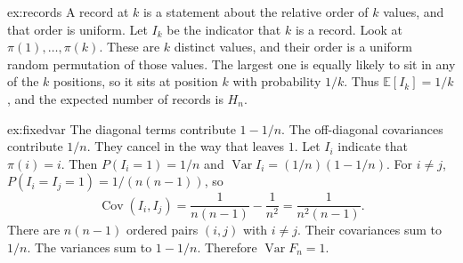 \begin{solution}{ex:records}
\idea A record at $k$ is a statement about the relative order of $k$ values, and that order is uniform.
\writeup Let $I_k$ be the indicator that $k$ is a record. Look at $\pi(1),\ldots,\pi(k)$. These are $k$ distinct values, and their order is a uniform random permutation of those values. The largest one is equally likely to sit in any of the $k$ positions, so it sits at position $k$ with probability $1/k$. Thus $\mathbb E[I_k]=1/k$, and the expected number of records is $H_n$.
\end{solution}

\begin{solution}{ex:fixedvar}
\idea The diagonal terms contribute $1-1/n$. The off-diagonal covariances contribute $1/n$. They cancel in the way that leaves $1$.
\writeup Let $I_i$ indicate that $\pi(i)=i$. Then $P(I_i=1)=1/n$ and $\operatorname{Var}I_i=(1/n)(1-1/n)$. For $i\ne j$, $P(I_i=I_j=1)=1/(n(n-1))$, so
\[
 \operatorname{Cov}(I_i,I_j)=\frac1{n(n-1)}-\frac1{n^2}=\frac1{n^2(n-1)}.
\]
There are $n(n-1)$ ordered pairs $(i,j)$ with $i\ne j$. Their covariances sum to $1/n$. The variances sum to $1-1/n$. Therefore $\operatorname{Var}F_n=1$.
\end{solution}

